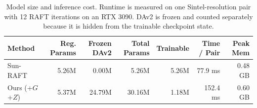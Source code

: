 \begin{table}[t]
\centering
\caption{Model size and inference cost. Runtime is measured on one Sintel-resolution pair with 12 RAFT iterations on an RTX 3090. DAv2 is frozen and counted separately because it is hidden from the trainable checkpoint state.}
\label{tab:model_cost}
\begin{tabular}{lrrrrrr}
\toprule
Method & Reg. Params & Frozen DAv2 & Total Params & Trainable & Time / Pair & Peak Mem \\
\midrule
Sun-RAFT & 5.26M & 0.00M & 5.26M & 5.26M & 77.9 ms & 0.48 GB \\
Ours (+$G$+$Z$) & 5.37M & 24.79M & 30.16M & 1.18M & 152.4 ms & 0.60 GB \\
\bottomrule
\end{tabular}
\end{table}

